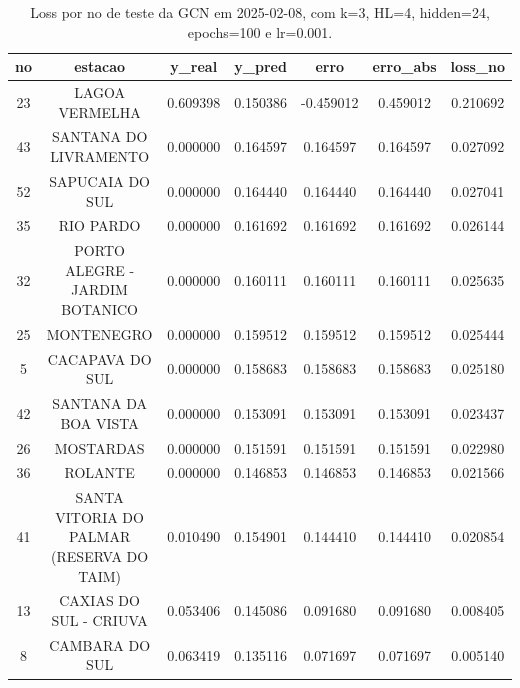 \begin{table}[h]
\centering
\caption{Loss por no de teste da GCN em 2025-02-08, com k=3, HL=4, hidden=24, epochs=100 e lr=0.001.}
\label{tab:gcn_loss_k3_hl4_h24_e100_d20250208}
\begin{tabular}{ccccccc}
\toprule
no & estacao & y\_real & y\_pred & erro & erro\_abs & loss\_no \\
\midrule
23 & LAGOA VERMELHA & 0.609398 & 0.150386 & -0.459012 & 0.459012 & 0.210692 \\
43 & SANTANA DO LIVRAMENTO & 0.000000 & 0.164597 & 0.164597 & 0.164597 & 0.027092 \\
52 & SAPUCAIA DO SUL & 0.000000 & 0.164440 & 0.164440 & 0.164440 & 0.027041 \\
35 & RIO PARDO & 0.000000 & 0.161692 & 0.161692 & 0.161692 & 0.026144 \\
32 & PORTO ALEGRE - JARDIM BOTANICO & 0.000000 & 0.160111 & 0.160111 & 0.160111 & 0.025635 \\
25 & MONTENEGRO & 0.000000 & 0.159512 & 0.159512 & 0.159512 & 0.025444 \\
5 & CACAPAVA DO SUL & 0.000000 & 0.158683 & 0.158683 & 0.158683 & 0.025180 \\
42 & SANTANA DA BOA VISTA & 0.000000 & 0.153091 & 0.153091 & 0.153091 & 0.023437 \\
26 & MOSTARDAS & 0.000000 & 0.151591 & 0.151591 & 0.151591 & 0.022980 \\
36 & ROLANTE & 0.000000 & 0.146853 & 0.146853 & 0.146853 & 0.021566 \\
41 & SANTA VITORIA DO PALMAR (RESERVA DO TAIM) & 0.010490 & 0.154901 & 0.144410 & 0.144410 & 0.020854 \\
13 & CAXIAS DO SUL - CRIUVA & 0.053406 & 0.145086 & 0.091680 & 0.091680 & 0.008405 \\
8 & CAMBARA DO SUL & 0.063419 & 0.135116 & 0.071697 & 0.071697 & 0.005140 \\
\bottomrule
\end{tabular}
\end{table}
